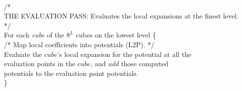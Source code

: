 \begin{tabbing}
\\
\>/*\\
\>THE EVALUATION PASS:  Evaluates the local expansions at the finest level.\\
\>*/\\
\> For each {\em cube} of the $ 8^L $ cubes on the lowest level \{ \\
\> \> /* Map local coefficients into potentials (L2P). */\\
\> \> Evaluate the $ cube$'s local expansion for the potential at all the\\
\> \> evaluation points in the $ cube $, and {\it add } those computed \\
\> \> potentials to the evaluation point potentials.\\
\> \} \\
\end{tabbing}

  
